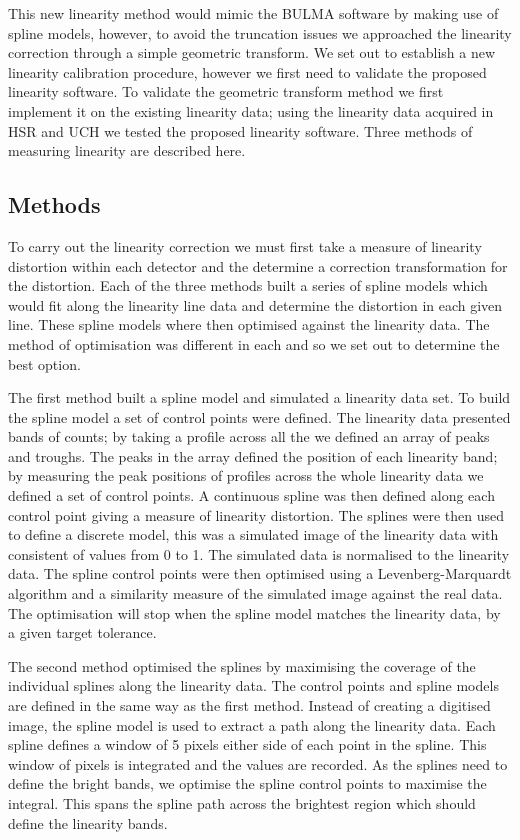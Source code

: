 This new linearity method would mimic the BULMA software by making use of spline models, however, to avoid the truncation issues we approached the linearity correction through a simple geometric transform. We set out to establish a new linearity calibration procedure, however we first need to validate the proposed linearity software. To validate the geometric transform method we first implement it on the existing linearity data; using the linearity data acquired in \acrshort{HSR} and \acrshort{UCH} we tested the proposed linearity software. Three methods of measuring linearity are described here. 
\subsection{Methods}
To carry out the linearity correction we must first take a measure of linearity distortion within each detector and the determine a correction transformation for the distortion. Each of the three methods built a series of spline models which would fit along the linearity line data and determine the distortion in each given line. These spline models where then optimised against the linearity data. The method of optimisation was different in each and so we set out to determine the best option. 

The first method built a spline model and simulated a linearity data set. To build the spline model a set of control points were defined. The linearity data presented bands of counts; by taking a profile across all the we defined an array of peaks and troughs. The peaks in the array defined the position of each linearity band; by measuring the peak positions of profiles across the whole linearity data we defined a set of control points. A continuous spline was then defined along each control point giving a measure of linearity distortion. The splines were then used to define a discrete model, this was a simulated image of the linearity data with consistent of values from 0 to 1. The simulated data is normalised to the linearity data. The spline control points were then optimised using a Levenberg-Marquardt algorithm and a similarity measure of the simulated image against the real data. The optimisation will stop when the spline model matches the linearity data, by a given target tolerance. 

The second method optimised the splines by maximising the coverage of the individual splines along the linearity data. The control points and spline models are defined in the same way as the first method. Instead of creating a digitised image, the spline model is used to extract a path along the linearity data. Each spline defines a window of 5 pixels either side of each point in the spline. This window of pixels is integrated and the values are recorded. As the splines need to define the bright bands, we optimise the spline control points to maximise the integral. This spans the spline path across  the brightest region which should define the linearity bands. 

